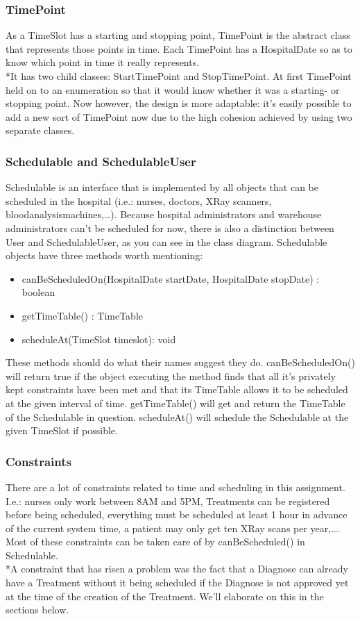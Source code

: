 \documentclass[11pt]{article}
\begin{document}
\subsubsection{TimePoint}
As a TimeSlot has a starting and stopping point, TimePoint is the abstract class that represents those points in time. Each TimePoint has a HospitalDate so as to know which point in time it really represents.
\\*It has two child classes: StartTimePoint and StopTimePoint. At first TimePoint held on to an enumeration so that it would know whether it was a starting- or stopping point. Now however, the design is more adaptable: it's easily possible to add a new sort of TimePoint now due to the high cohesion achieved by using two separate classes.

\subsubsection{Schedulable and SchedulableUser}
Schedulable is an interface that is implemented by all objects that can be scheduled in the hospital (i.e.: nurses, doctors, XRay scanners, bloodanalysismachines,…). Because hospital administrators and warehouse administrators can’t be scheduled for now, there is also a distinction between User and SchedulableUser, as you can see in the class diagram.
Schedulable objects have three methods worth mentioning: 
\begin{itemize}
\item{canBeScheduledOn(HospitalDate startDate, HospitalDate stopDate) : boolean}
\item{getTimeTable() : TimeTable}
\item{scheduleAt(TimeSlot timeslot): void}
\end{itemize}
These methods should do what their names suggest they do. canBeScheduledOn() will return true if the object executing the method finds that all it’s privately kept constraints have been met and that its TimeTable allows it to be scheduled at the given interval of time. getTimeTable() will get and return the TimeTable of the Schedulable in question. scheduleAt() will schedule the Schedulable at the given TimeSlot if possible.

\subsubsection{Constraints}
There are a lot of constraints related to time and scheduling in this assignment. I.e.: nurses only work between 8AM and 5PM, Treatments can be registered before being scheduled, everything must be scheduled at least 1 hour in advance of the current system time, a patient may only get ten XRay scans per year,\dots. Most of these constraints can be taken care of by canBeScheduled() in Schedulable. 
\\*A constraint that has risen a problem was the fact that a Diagnose can already have a Treatment without it being scheduled if the Diagnose is not approved yet at the time of the creation of the Treatment. We'll elaborate on this in the sections below.
\end{document}
